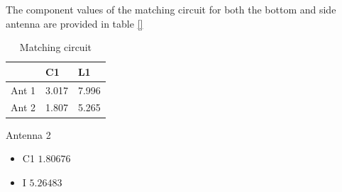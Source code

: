 The component values of the matching circuit for both the bottom and side antenna are provided in table \ref{}

\begin{table}[]
\centering
\begin{tabular}{|l|l|l|}
\hline
      & C1    & L1    \\ \hline
Ant 1 & 3.017 & 7.996 \\ \hline
Ant 2 & 1.807 & 5.265 \\ \hline
\end{tabular}
\caption{Matching circuit}
\label{tab:ant1_matching}
\end{table}

\item Antenna 2
\begin{itemize}
\item C1 $1.80676$
\item I $5.26483$
\end{itemize}




